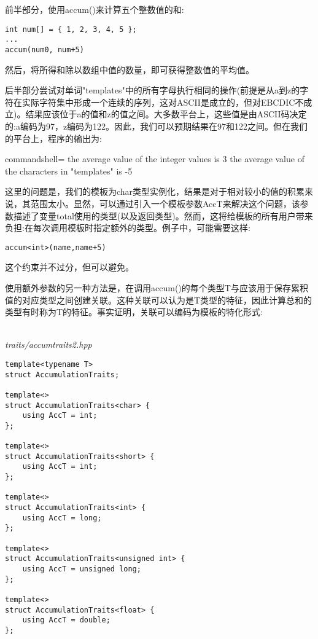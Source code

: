 前半部分，使用accum()来计算五个整数值的和:

\begin{lstlisting}[style=styleCXX]
int num[] = { 1, 2, 3, 4, 5 };
...
accum(num0, num+5)
\end{lstlisting}

然后，将所得和除以数组中值的数量，即可获得整数值的平均值。

后半部分尝试对单词"templates"中的所有字母执行相同的操作(前提是从a到z的字符在实际字符集中形成一个连续的序列，这对ASCII是成立的，但对EBCDIC不成立)。结果应该位于a的值和z的值之间。大多数平台上，这些值是由ASCII码决定的:a编码为97，z编码为122。因此，我们可以预期结果在97和122之间。但在我们的平台上，程序的输出为:

\begin{tcblisting}{commandshell={}}
the average value of the integer values is 3
the average value of the characters in "templates" is -5
\end{tcblisting}

这里的问题是，我们的模板为char类型实例化，结果是对于相对较小的值的积累来说，其范围太小。显然，可以通过引入一个模板参数AccT来解决这个问题，该参数描述了变量total使用的类型(以及返回类型)。然而，这将给模板的所有用户带来负担:在每次调用模板时指定额外的类型。例子中，可能需要这样:

\begin{lstlisting}[style=styleCXX]
accum<int>(name,name+5)
\end{lstlisting}

这个约束并不过分，但可以避免。

使用额外参数的另一种方法是，在调用accum()的每个类型T与应该用于保存累积值的对应类型之间创建关联。这种关联可以认为是T类型的特征，因此计算总和的类型有时称为T的特征。事实证明，关联可以编码为模板的特化形式:

\hspace*{\fill} \\ %
\noindent
\textit{traits/accumtraits2.hpp}
\begin{lstlisting}[style=styleCXX]
template<typename T>
struct AccumulationTraits;

template<>
struct AccumulationTraits<char> {
	using AccT = int;
};

template<>
struct AccumulationTraits<short> {
	using AccT = int;
};

template<>
struct AccumulationTraits<int> {
	using AccT = long;
};

template<>
struct AccumulationTraits<unsigned int> {
	using AccT = unsigned long;
};

template<>
struct AccumulationTraits<float> {
	using AccT = double;
};
\end{lstlisting}

